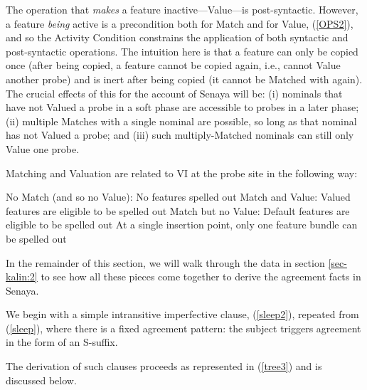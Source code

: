 \documentclass[output=paper
,modfonts
,nonflat]{langsci/langscibook}
\begin{document}
\noindent The operation that \textit{makes} a feature inactive---Value---is post-syntactic. However, a feature \textit{being} active is a precondition both for Match and for Value, (\ref{OPS2}), and so the Activity Condition constrains the application of both syntactic and post-syntactic operations. The intuition here is that a feature can only be copied once \citep{Bejar03} (after being copied, a feature cannot be copied again, i.e., cannot Value another probe) and is inert after being copied (it cannot be Matched with again). The crucial effects of this for the account of Senaya will be: (i) nominals that have not Valued a probe in a soft phase are accessible to probes in a later phase; (ii) multiple Matches with a single nominal are possible, so long as that nominal has not Valued a probe; and (iii) such multiply-Matched nominals can still only Value one probe.

Matching and Valuation are related to VI at the probe site in the following way: 

\eal
\ex No Match (and so no Value): No features spelled out\footnotemark
\ex Match and Value: Valued features are eligible to be spelled out
\ex Match but no Value: Default features are eligible to be spelled out
\ex At a single insertion point, only one feature bundle can be spelled out
\zl 


\noindent In the remainder of this section, we will walk through the data in section \ref{sec-kalin:2} to see how all these pieces come together to derive the agreement facts in Senaya. 

We begin with a simple intransitive imperfective clause, (\ref{sleep2}), repeated from (\ref{sleep}), where there is a fixed agreement pattern: the subject triggers agreement in the form of an S-suffix.

\z

\noindent The derivation of such clauses proceeds as represented in (\ref{tree3}) and is discussed below.
\end{document}
